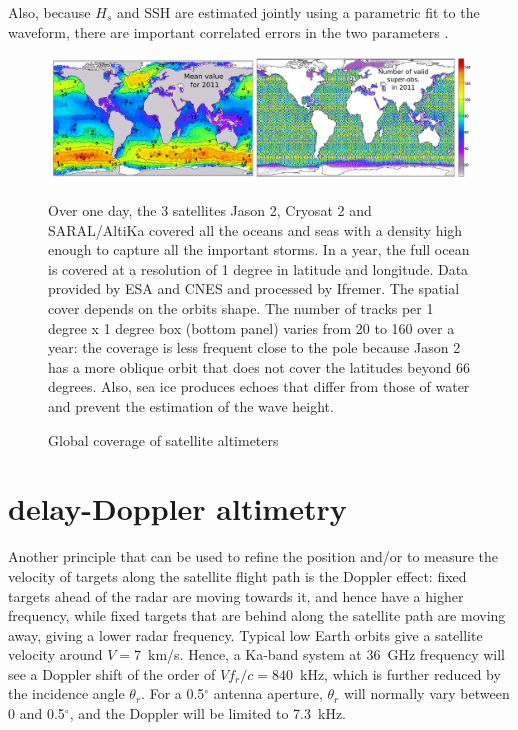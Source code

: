  Also, because $H_s$ and SSH are estimated jointly using a parametric fit to the waveform, there are important correlated errors in the two parameters \citep[e.g.][]{Dibarboure&al.2014,DeCarlo&al.2023}. 
\begin{figure}[htb]
\centerline{\includegraphics[width=\textwidth]{FIGS_CH_SAT/altimetre_cartes2011.pdf}}
  \caption{Global coverage of satellite altimeters}
    {Over one day, the 3 satellites Jason 2, Cryosat 2 and SARAL/AltiKa covered all the oceans and seas with a density high enough to capture all the 
important storms. In a year, the full ocean is covered at a resolution of 1 degree in latitude and longitude.  
 Data provided by ESA and CNES and processed by Ifremer. The spatial 
cover depends on the orbits shape. The number of tracks per 1 degree x 1 degree box (bottom panel) varies
from 20 to 160 over a year: the coverage is less frequent close to the pole because Jason 2 has a more oblique orbit that does not cover the 
latitudes beyond 66 degrees. Also, sea ice  produces echoes that differ from those of water and prevent the estimation of the wave height.} 
\label{fig:altimeter_coverage}
\end{figure}



\section{delay-Doppler altimetry}\label{section:delay-Doppler}
Another principle that can be used to refine the position and/or to measure the velocity of targets along the satellite flight path is the Doppler effect: fixed targets ahead of the radar are moving towards it, and hence have a higher frequency, while fixed targets that are behind along the satellite path 
are moving away, giving a lower radar frequency. Typical low Earth orbits give a satellite velocity around $V=7$~km/s. Hence, a Ka-band system at 36~GHz frequency will see a Doppler shift
of the order of $V f_r/c = 840$~kHz, which is further reduced by the incidence angle $\theta_r$. For a 0.5$^\circ$  antenna aperture, $\theta_r$ will 
normally vary between 0 and 0.5$^\circ$,  and the Doppler will be limited to 7.3~kHz.  

